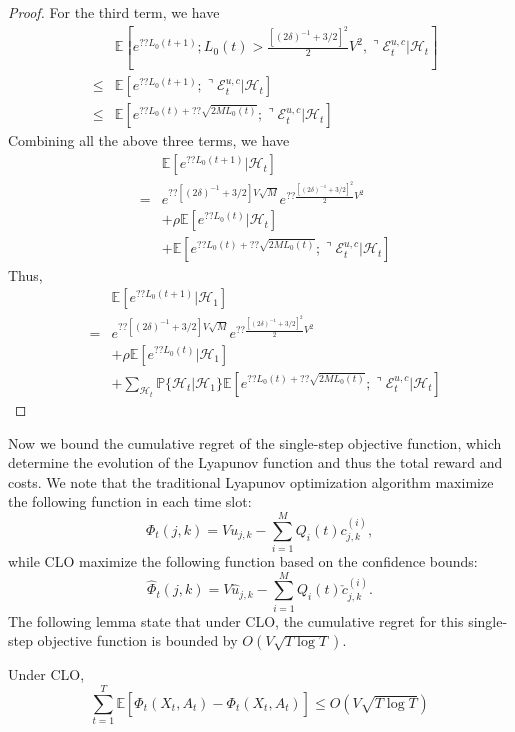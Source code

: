 \begin{proof}
For the third term, we have
\begin{eqnarray}
&& \mathbb{E}[e^{?? L_0(t+1)}; L_0(t) > \frac{[(2\delta)^{-1} + 3/2]^2}{2} V^2, \urcorner \mathcal{E}^{u,c}_t |\mathcal{H}_{t}] \nonumber \\
&\leq & \mathbb{E}[e^{?? L_0(t+1)}; \urcorner \mathcal{E}^{u,c}_t |\mathcal{H}_{t}] \nonumber \\
&\leq & \mathbb{E}[e^{?? L_0(t) + ??\sqrt{2M L_0(t)}}; \urcorner \mathcal{E}^{u,c}_t |\mathcal{H}_{t}] 
\end{eqnarray}
Combining all the above three terms, we have
\begin{eqnarray}
&&\mathbb{E}[e^{?? L_0(t+1)}|\mathcal{H}_{t}] \nonumber \\
&=& e^{??[(2\delta)^{-1} + 3/2]V\sqrt{M}} e^{??\frac{[(2\delta)^{-1} + 3/2]^2}{2} V^2}  \nonumber \\
&& + \rho \mathbb{E}[e^{?? L_0(t)} |\mathcal{H}_{t}] \nonumber \\
&& + \mathbb{E}[e^{?? L_0(t) + ??\sqrt{2M L_0(t)}}; \urcorner \mathcal{E}^{u,c}_t |\mathcal{H}_{t}] \nonumber
\end{eqnarray}
Thus,
\begin{eqnarray}
&&\mathbb{E}[e^{?? L_0(t+1)}|\mathcal{H}_1] \nonumber \\
&=& e^{??[(2\delta)^{-1} + 3/2]V\sqrt{M}} e^{??\frac{[(2\delta)^{-1} + 3/2]^2}{2} V^2}  \nonumber \\
&& + \rho \mathbb{E}[e^{?? L_0(t)} |\mathcal{H}_1] \nonumber \\
&& + \sum_{\mathcal{H}_t}\mathbb{P}\{\mathcal{H}_t | \mathcal{H}_1\}\mathbb{E}[e^{?? L_0(t) + ??\sqrt{2M L_0(t)}}; \urcorner \mathcal{E}^{u,c}_t |\mathcal{H}_{t}] \nonumber
\end{eqnarray}
\end{proof}

Now we bound the cumulative regret of the single-step objective function, which determine the evolution of the Lyapunov function and thus the total reward and costs.
We note that the  traditional Lyapunov optimization algorithm maximize the following function in each time slot:
\begin{equation}
\Phi_t(j,k) = V u_{j,k} - \sum_{i = 1}^M Q_i(t) c^{(i)}_{j,k},
\end{equation}
while CLO maximize the following function based on the confidence bounds:
\begin{equation}
\hat{\Phi}_t(j,k) = V \hat{u}_{j,k} - \sum_{i = 1}^M Q_i(t) \check{c}^{(i)}_{j,k}.
\end{equation}
The following lemma state that under CLO, the cumulative regret for this single-step objective function is bounded by $O(V \sqrt{T \log T})$.
\begin{lemma} \label{thm:sum_ucb_bound}
Under CLO,
\begin{equation}
\sum_{t = 1}^T \mathbb{E}[ \hat{\Phi}_t(X_t,A_t) - \Phi_t(X_t,A_t) ] \leq O(V \sqrt{T \log T})
\end{equation}
\end{lemma}

